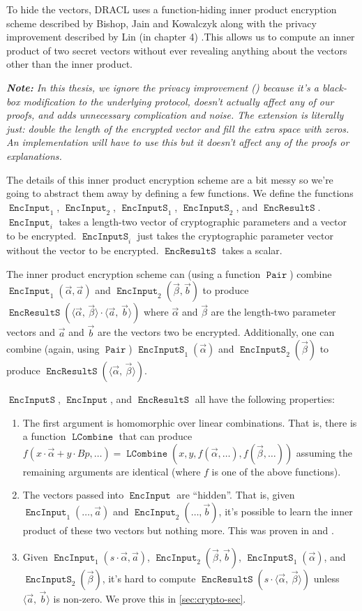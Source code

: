 \documentclass[pdftex,12pt,a4papaer,twoside,notitlepage]{report}
\newcommand{\note}[1]{\vspace{1em} \begin{spacing}{1}\textit{\textbf{Note:} #1}\end{spacing}\vspace{1em}}
\newcommand{\iprod}[2]{\langle #1,\,#2\rangle}
\DeclareMathOperator{\ein}{\mathtt{EncInput}}
\DeclareMathOperator{\combine}{\mathtt{LCombine}}
\DeclareMathOperator{\eins}{\mathtt{EncInputS}}
\DeclareMathOperator{\eouts}{\mathtt{EncResultS}}
\DeclareMathOperator{\pair}{\mathtt{Pair}}
\begin{document}
To hide the vectors, DRACL uses a function-hiding inner product encryption
scheme described by Bishop, Jain and Kowalczyk \cite{inner-product} along with
the privacy improvement described by Lin (in chapter 4)
\cite{inner-product-ext}.This allows us to compute an inner product of two
secret vectors without ever revealing anything about the vectors other than the
inner product.

\note{In this thesis, we ignore the privacy improvement
  (\cite{inner-product-ext}) because it's a black-box modification to the
  underlying protocol, doesn't actually affect any of our proofs, and adds
  unnecessary complication and noise. The extension is literally just: double
  the length of the encrypted vector and fill the extra space with zeros. An
  implementation will have to use this but it doesn't affect any of the proofs
  or explanations.}

\newcommand{\Ap}{\vec{\alpha}}
\newcommand{\Bp}{\vec{\beta}}
\newcommand{\ABp}{\iprod{\Ap}{\Bp}}

The details of this inner product encryption scheme are a bit messy so we're
going to abstract them away by defining a few functions. We define the functions
\allowbreak$\ein_1$, $\ein_2$, $\eins_1$, $\eins_2$, and $\eouts$. $\ein_i$
takes a length-two vector of cryptographic parameters and a vector to be
encrypted. $\eins_i$ just takes the cryptographic parameter vector without the
vector to be encrypted. $\eouts$ takes a scalar.

The inner product encryption scheme can (using a function $\pair$) combine
\allowbreak$\ein_1(\Ap, \vec{a})$ and \allowbreak$\ein_2(\Bp, \vec{b})$ to
produce $\eouts(\ABp\cdot\iprod{\vec{a}}{\vec{b}})$ where $\Ap$ and $\Bp$ are
the length-two parameter vectors and $\vec{a}$ and $\vec{b}$ are the vectors two
be encrypted. Additionally, one can combine (again, using $\pair$)
$\eins_1(\Ap)$ and $\eins_2(\Bp)$ to produce $\eouts(\ABp)$.

$\eins$, $\ein$, and $\eouts$ all have the following properties: 
\begin{enumerate}
\item The first argument is homomorphic over linear combinations. That is, there
  is a function $\combine$ that can produce $f(x\cdot \Ap + y\cdot Bp, \ldots) =
  \combine(x, y, f(\Ap, \ldots), f(\Bp, \ldots))$ assuming the remaining
  arguments are identical (where $f$ is one of the above functions).
\item The vectors passed into $\ein$ are ``hidden''. That is, given
  $\ein_1(\ldots, \vec{a})$ and $\ein_2(\ldots, \vec{b})$, it's possible to
  learn the inner product of these two vectors but nothing more. This was proven
  in \cite{inner-product} and \cite{inner-product-ext}.
\item Given $\ein_1(s \cdot \Ap, \vec{a})$, $\ein_2(\Bp, \vec{b})$,
  $\eins_1(\Ap)$, and $\eins_2(\Bp)$, it's hard to compute $\eouts(s\cdot\ABp)$
  unless $\iprod{\vec{a}}{\vec{b}}$ is non-zero. We prove this in
  \cref{sec:crypto-sec}.
\end{enumerate}
\end{document}
